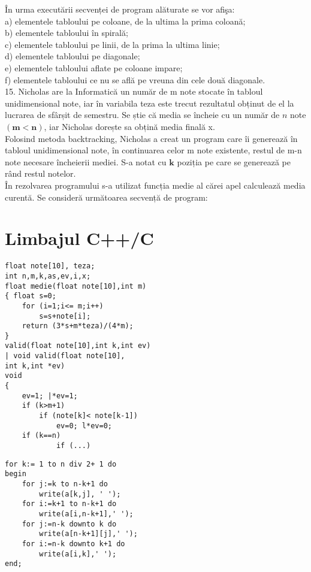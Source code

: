 În urma executării secvenței de program alăturate se vor afişa:\\
a) elementele tabloului pe coloane, de la ultima la prima coloană;\\
b) elementele tabloului în spirală;\\
c) elementele tabloului pe linii, de la prima la ultima linie;\\
d) elementele tabloului pe diagonale;\\
e) elementele tabloului aflate pe coloane impare;\\
f) elementele tabloului ce nu se află pe vreuna din cele două diagonale.\\
15. Nicholas are la Informatică un număr de m note stocate în tabloul unidimensional note, iar în variabila teza este trecut rezultatul obținut de el la lucrarea de sfârșit de semestru. Se știe că media se încheie cu un număr de $n$ note $(\mathbf{m}<\mathbf{n})$, iar Nicholas dorește sa obțină media finală x.\\
Folosind metoda backtracking, Nicholas a creat un program care îi generează în tabloul unidimensional note, în continuarea celor m note existente, restul de m-n note necesare încheierii mediei. S-a notat cu $\mathbf{k}$ poziția pe care se generează pe rând restul notelor.\\
În rezolvarea programului s-a utilizat funcția medie al cărei apel calculează media curentă. Se consideră următoarea secvență de program:

\section*{Limbajul C++/C}
\begin{verbatim}
float note[10], teza;
int n,m,k,as,ev,i,x;
float medie(float note[10],int m)
{ float s=0;
    for (i=1;i<= m;i++)
        s=s+note[i];
    return (3*s+m*teza)/(4*m);
}
valid(float note[10],int k,int ev)
| void valid(float note[10],
int k,int *ev)
void
{
    ev=1; |*ev=1;
    if (k>m+1)
        if (note[k]< note[k-1])
            ev=0; l*ev=0;
    if (k==n)
            if (...)
\end{verbatim}

\begin{verbatim}
for k:= 1 to n div 2+ 1 do
begin
    for j:=k to n-k+1 do
        write(a[k,j], ' ');
    for i:=k+1 to n-k+1 do
        write(a[i,n-k+1],' ');
    for j:=n-k downto k do
        write(a[n-k+1][j],' ');
    for i:=n-k downto k+1 do
        write(a[i,k],' ');
end;
\end{verbatim}

